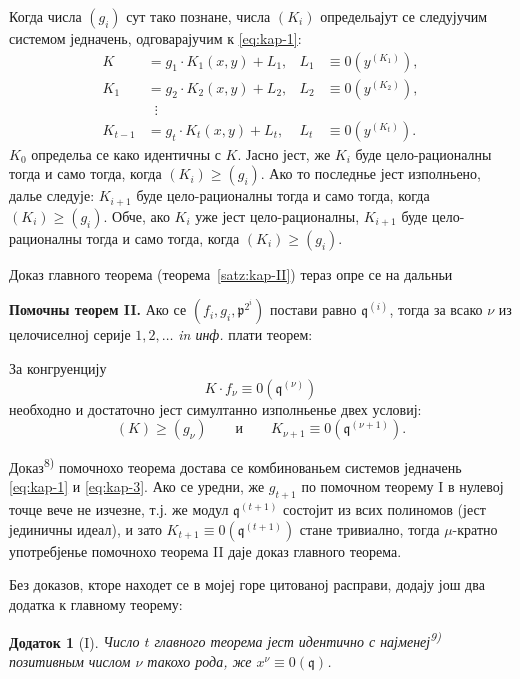 \documentclass[11pt]{article}
\theoremstyle{plain}
\newtheorem{zusatz}{Додаток}
\begin{document}
Когда числа $(g_{i})$ сут тако познане, числа $(K_{i})$ определьајут
се следујучим системом једначень, одговарајучим к \eqref{eq:kap-1}:
\begin{equation}\label{eq:kap-3}
\begin{aligned}
K &= g_{1} \cdot K_{1}(x,y) + L_{1}, & L_{1} &\equiv 0(y^{(K_{1})}),\\
K_{1} &= g_{2} \cdot K_{2}(x,y) + L_{2}, & L_{2} &\equiv 0(y^{(K_{2})}),\\
&\;\;\vdots &&\\
K_{t-1} &= g_{t} \cdot K_{t}(x,y) + L_{t}, & L_{t} &\equiv 0(y^{(K_{t})}).
\end{aligned}
\end{equation}
$K_{0}$ определьа се како идентичны с $K$. Јасно јест, же $K_{i}$
буде цело-рационалны тогда и само тогда, когда
$(K_{i}) \geq (g_{i})$. Ако то последнье јест изполньено, далье
следује: $K_{i+1}$ буде цело-рационалны тогда и само тогда, когда
$(K_{i}) \geq (g_{i})$. Обче, ако $K_{i}$ уже јест цело-рационалны,
$K_{i+1}$ буде цело-рационалны тогда и само тогда, когда
$(K_{i}) \geq (g_{i})$.

Доказ главного теорема (теорема~\ref{satz:kap-II}) тераз опре се на
дальньи

\smallskip
\textbf{Помочны теорем II.} Ако се
$(f_{i}, g_{i}, \mathfrak{p}^{2^{i}})$ постави равно
$\mathfrak{q}^{(i)}$, тогда за всако $\nu$ из целочиселној серије
$1, 2, \ldots$ \textit{in инф.} плати теорем:

За конгруенцију
\[
K \cdot f_{\nu} \equiv 0(\mathfrak{q}^{(\nu)})
\]
необходно и достаточно јест симултанно изполньенье двех условиј:
\[
(K) \geq (g_{\nu}) \qquad \text{и} \qquad K_{\nu+1} \equiv 0(\mathfrak{q}^{(\nu+1)}).
\]

Доказ\textsuperscript{8)} помочнохо теорема достава се комбинованьем
системов једначень \eqref{eq:kap-1} и \eqref{eq:kap-3}. Ако се
уредни, же $g_{t+1}$ по помочном теорему I в нулевој точце вече не
изчезне, т.ј. же модул $\mathfrak{q}^{(t+1)}$ состојит из всих
полиномов (јест јединичны идеал), и зато
$K_{t+1} \equiv 0(\mathfrak{q}^{(t+1)})$ стане тривиално, тогда
$\mu$-кратно употребјенье помочнохо теорема II даје доказ главного
теорема.

\smallskip
Без доказов, кторе находет се в мојеј горе цитованој расправи,
додају још два додатка к главному теорему:

\begin{zusatz}[I]
Число $t$ главного теорема јест идентично с најменеј\textsuperscript{9)}
позитивным числом $\nu$ такохо рода, же
$x^{\nu} \equiv 0(\mathfrak{q})$.
\end{zusatz}
\end{document}
